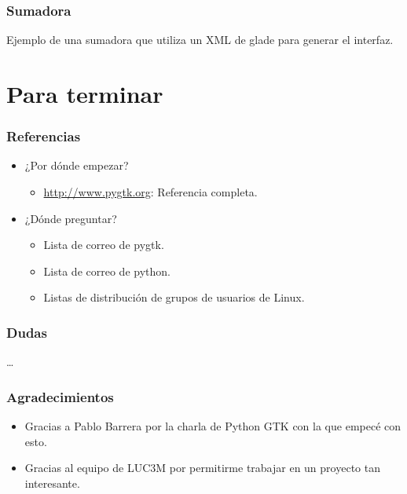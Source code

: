 \documentclass[10pt]{beamer}
\begin{document}
  \begin{frame}[containsverbatim]
    \frametitle{Sumadora}
    Ejemplo de una sumadora que utiliza un XML de glade para generar el interfaz.
  \end{frame}
  
  \section*{Para terminar}
 
  \begin{frame}
    \frametitle{Referencias}
    \begin{itemize}
      \item ¿Por dónde empezar?
        \begin{itemize}
	  \item \url{http://www.pygtk.org}: Referencia completa.
        \end{itemize}
      \item ¿Dónde preguntar?
        \begin{itemize}
	  \item Lista de correo de pygtk.
	  \item Lista de correo de python.
	  \item Listas de distribución de grupos de usuarios de Linux.
        \end{itemize}
    \end{itemize}
  \end{frame}

  \begin{frame}
    \frametitle{Dudas}
    \dots
  \end{frame}
  
  \begin{frame}
    \frametitle{Agradecimientos}
    \begin{itemize}
      \item Gracias a Pablo Barrera por la charla de Python GTK con la que empecé con esto.
      \item Gracias al equipo de LUC3M por permitirme trabajar en un proyecto tan interesante.
    \end{itemize}
  \end{frame}

\end{document}
